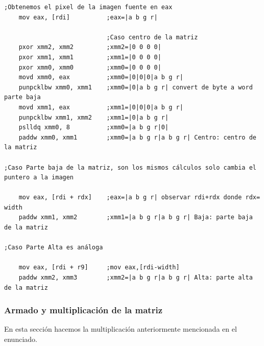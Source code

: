 \begin{codesnippet}
\begin{verbatim}    
;Obtenemos el pixel de la imagen fuente en eax
    mov eax, [rdi]          ;eax=|a b g r|

                            ;Caso centro de la matriz
    pxor xmm2, xmm2         ;xmm2=|0 0 0 0|
    pxor xmm1, xmm1         ;xmm1=|0 0 0 0|
    pxor xmm0, xmm0         ;xmm0=|0 0 0 0|
    movd xmm0, eax          ;xmm0=|0|0|0|a b g r|
    punpcklbw xmm0, xmm1    ;xmm0=|0|a b g r| convert de byte a word parte baja
    movd xmm1, eax          ;xmm1=|0|0|0|a b g r|
    punpcklbw xmm1, xmm2    ;xmm1=|0|a b g r|     
    pslldq xmm0, 8          ;xmm0=|a b g r|0|
    paddw xmm0, xmm1        ;xmm0=|a b g r|a b g r| Centro: centro de la matriz

;Caso Parte baja de la matriz, son los mismos cálculos solo cambia el puntero a la imagen

    mov eax, [rdi + rdx]    ;eax=|a b g r| observar rdi+rdx donde rdx= width
    paddw xmm1, xmm2        ;xmm1=|a b g r|a b g r| Baja: parte baja de la matriz

;Caso Parte Alta es análoga

    mov eax, [rdi + r9]     ;mov eax,[rdi-width]
    paddw xmm2, xmm3        ;xmm2=|a b g r|a b g r| Alta: parte alta de la matriz	
\end{verbatim}
\end{codesnippet}

\subsubsection*{Armado y multiplicación de la matriz}

En esta sección hacemos la multiplicación anteriormente mencionada en el enunciado.

